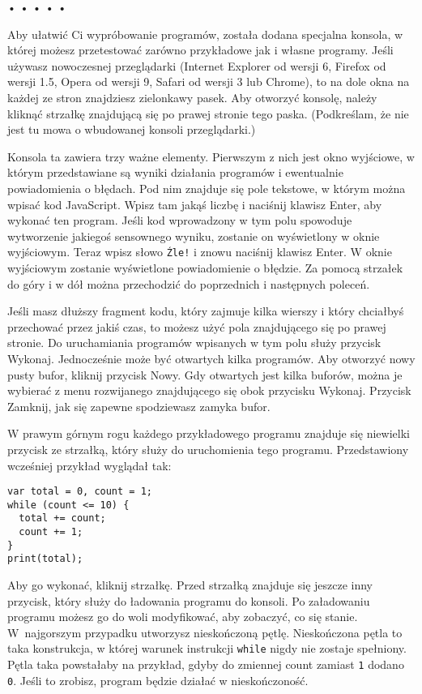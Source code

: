\begin{center}
• • • • •
\end{center}

  
Aby ułatwić Ci wypróbowanie programów, została dodana specjalna konsola, w której możesz przetestować zarówno przykładowe jak i własne programy. Jeśli używasz nowoczesnej przeglądarki (Internet Explorer od wersji 6, Firefox od wersji 1.5, Opera od wersji 9, Safari od wersji 3 lub Chrome), to na dole okna na każdej ze stron znajdziesz zielonkawy pasek. Aby otworzyć konsolę, należy kliknąć strzałkę znajdującą się po prawej stronie tego paska. (Podkreślam, że nie jest tu mowa o wbudowanej konsoli przeglądarki.)

  
Konsola ta zawiera trzy ważne elementy. Pierwszym z nich jest okno wyjściowe, w którym przedstawiane są wyniki działania programów i ewentualnie powiadomienia o błędach. Pod nim znajduje się pole tekstowe, w którym można wpisać kod JavaScript. Wpisz tam jakąś liczbę i naciśnij klawisz Enter, aby wykonać ten program. Jeśli kod wprowadzony w tym polu spowoduje wytworzenie jakiegoś sensownego wyniku, zostanie on wyświetlony w oknie wyjściowym. Teraz wpisz słowo \texttt{Źle!} i znowu naciśnij klawisz Enter. W oknie wyjściowym zostanie wyświetlone powiadomienie o błędzie. Za pomocą strzałek do góry i w dół można przechodzić do poprzednich i następnych poleceń.

  
Jeśli masz dłuższy fragment kodu, który zajmuje kilka wierszy i który chciałbyś przechować przez jakiś czas, to możesz użyć pola znajdującego się po prawej stronie. Do uruchamiania programów wpisanych w tym polu służy przycisk Wykonaj. Jednocześnie może być otwartych kilka programów. Aby otworzyć nowy pusty bufor, kliknij przycisk Nowy. Gdy otwartych jest kilka buforów, można je wybierać z menu rozwijanego znajdującego się obok przycisku Wykonaj. Przycisk Zamknij, jak się zapewne spodziewasz zamyka bufor.

  
W prawym górnym rogu każdego przykładowego programu znajduje się niewielki przycisk ze strzałką, który służy do uruchomienia tego programu. Przedstawiony wcześniej przykład wyglądał tak:

  
\begin{verbatim} 
var total = 0, count = 1;
while (count <= 10) {
  total += count;
  count += 1;
}
print(total);
 \end{verbatim}
  
Aby go wykonać, kliknij strzałkę. Przed strzałką znajduje się jeszcze inny przycisk, który służy do ładowania programu do konsoli. Po załadowaniu programu możesz go do woli modyfikować, aby zobaczyć, co się stanie. W~najgorszym przypadku utworzysz nieskończoną pętlę. Nieskończona pętla to taka konstrukcja, w której warunek instrukcji \texttt{while} nigdy nie zostaje spełniony. Pętla taka powstałaby na przykład, gdyby do zmiennej count zamiast \texttt{1} dodano \texttt{0}. Jeśli to zrobisz, program będzie działać w nieskończoność.

